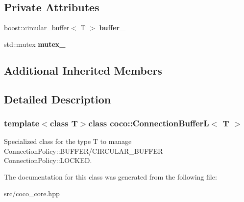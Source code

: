 \subsection*{Private Attributes}
\begin{DoxyCompactItemize}
\item 
\hypertarget{classcoco_1_1_connection_buffer_l_ab5751072ac523ef93ee8d91b931665fc}{}boost\+::circular\+\_\+buffer$<$ T $>$ {\bfseries buffer\+\_\+}\label{classcoco_1_1_connection_buffer_l_ab5751072ac523ef93ee8d91b931665fc}

\item 
\hypertarget{classcoco_1_1_connection_buffer_l_af48584ab0e687ad16dd0ae0bde043297}{}std\+::mutex {\bfseries mutex\+\_\+}\label{classcoco_1_1_connection_buffer_l_af48584ab0e687ad16dd0ae0bde043297}

\end{DoxyCompactItemize}
\subsection*{Additional Inherited Members}


\subsection{Detailed Description}
\subsubsection*{template$<$class T$>$class coco\+::\+Connection\+Buffer\+L$<$ T $>$}

Specialized class for the type T to manage Connection\+Policy\+::\+B\+U\+F\+F\+E\+R/\+C\+I\+R\+C\+U\+L\+A\+R\+\_\+\+B\+U\+F\+F\+E\+R Connection\+Policy\+::\+L\+O\+C\+K\+E\+D. 

The documentation for this class was generated from the following file\+:\begin{DoxyCompactItemize}
\item 
src/coco\+\_\+core.\+hpp\end{DoxyCompactItemize}
